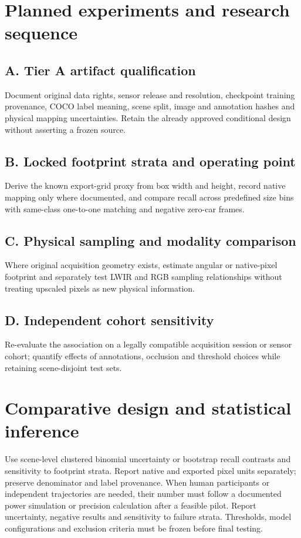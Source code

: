 \documentclass[11pt,a4paper]{article}
\begin{document}
\section{Planned experiments and research sequence}
\subsection{A. Tier A artifact qualification}
Document original data rights, sensor release and resolution, checkpoint training provenance, COCO label meaning, scene split, image and annotation hashes and physical mapping uncertainties. Retain the already approved conditional design without asserting a frozen source.

\subsection{B. Locked footprint strata and operating point}
Derive the known export-grid proxy from box width and height, record native mapping only where documented, and compare recall across predefined size bins with same-class one-to-one matching and negative zero-car frames.

\subsection{C. Physical sampling and modality comparison}
Where original acquisition geometry exists, estimate angular or native-pixel footprint and separately test LWIR and RGB sampling relationships without treating upscaled pixels as new physical information.

\subsection{D. Independent cohort sensitivity}
Re-evaluate the association on a legally compatible acquisition session or sensor cohort; quantify effects of annotations, occlusion and threshold choices while retaining scene-disjoint test sets.

\section{Comparative design and statistical inference}
Use scene-level clustered binomial uncertainty or bootstrap recall contrasts and sensitivity to footprint strata. Report native and exported pixel units separately; preserve denominator and label provenance. When human participants or independent trajectories are needed, their number must follow a documented power simulation or precision calculation after a feasible pilot. Report uncertainty, negative results and sensitivity to failure strata. Thresholds, model configurations and exclusion criteria must be frozen before final testing.
\end{document}
